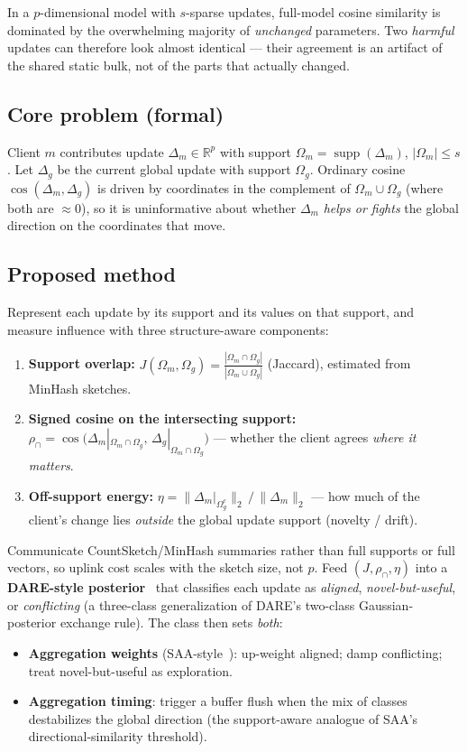 \documentclass[11pt]{article}
\newcommand{\supp}{\operatorname{supp}}
\newcommand{\R}{\mathbb{R}}
\begin{document}
\begin{claimbox}
In a $p$-dimensional model with $s$-sparse updates, full-model cosine similarity is
dominated by the overwhelming majority of \emph{unchanged} parameters. Two \emph{harmful}
updates can therefore look almost identical --- their agreement is an artifact of the
shared static bulk, not of the parts that actually changed.
\end{claimbox}

\subsection*{Core problem (formal)}
Client $m$ contributes update $\Delta_m\in\R^{p}$ with support $\Omega_m=\supp(\Delta_m)$,
$|\Omega_m|\le s$. Let $\Delta_g$ be the current global update with support $\Omega_g$.
Ordinary cosine $\cos(\Delta_m,\Delta_g)$ is driven by coordinates in the complement of
$\Omega_m\cup\Omega_g$ (where both are $\approx 0$), so it is uninformative about whether
$\Delta_m$ \emph{helps or fights} the global direction on the coordinates that move.

\subsection*{Proposed method}
Represent each update by its support and its values on that support, and measure influence
with three structure-aware components:
\begin{enumerate}[leftmargin=1.5em,itemsep=1pt]
\item \textbf{Support overlap:} $J(\Omega_m,\Omega_g)=\frac{|\Omega_m\cap\Omega_g|}{|\Omega_m\cup\Omega_g|}$ (Jaccard), estimated from MinHash sketches.
\item \textbf{Signed cosine on the intersecting support:}
$\rho_{\cap}=\cos\!\big(\Delta_m|_{\Omega_m\cap\Omega_g},\,\Delta_g|_{\Omega_m\cap\Omega_g}\big)$ --- whether the client agrees \emph{where it matters}.
\item \textbf{Off-support energy:} $\eta=\|\Delta_m|_{\Omega_g^{c}}\|_2\,/\,\|\Delta_m\|_2$ --- how much of the client's change lies \emph{outside} the global update support (novelty / drift).
\end{enumerate}
Communicate CountSketch/MinHash summaries rather than full supports or full vectors, so
uplink cost scales with the sketch size, not $p$. Feed $(J,\rho_{\cap},\eta)$ into a
\textbf{DARE-style posterior}~\cite{dare} that classifies each update as \emph{aligned},
\emph{novel-but-useful}, or \emph{conflicting} (a three-class generalization of DARE's
two-class Gaussian-posterior exchange rule). The class then sets \emph{both}:
\begin{itemize}[leftmargin=1.5em,nosep]
\item \textbf{Aggregation weights} (SAA-style~\cite{saa}): up-weight aligned; damp conflicting; treat novel-but-useful as exploration.
\item \textbf{Aggregation timing}: trigger a buffer flush when the mix of classes destabilizes the global direction (the support-aware analogue of SAA's directional-similarity threshold).
\end{itemize}
\end{document}
